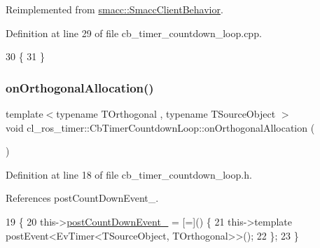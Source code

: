 Reimplemented from \hyperlink{classsmacc_1_1SmaccClientBehavior_a7e4fb6ce81ff96dc172425852d69c0c5}{smacc\+::\+Smacc\+Client\+Behavior}.



Definition at line 29 of file cb\+\_\+timer\+\_\+countdown\+\_\+loop.\+cpp.


\begin{DoxyCode}
30 \{
31 \}
\end{DoxyCode}
\mbox{\label{classcl__ros__timer_1_1CbTimerCountdownLoop_a17ca92a8d78d823b217b0418fa3b09d7}} 
\subsubsection{\texorpdfstring{on\+Orthogonal\+Allocation()}{onOrthogonalAllocation()}}
{\footnotesize\ttfamily template$<$typename T\+Orthogonal , typename T\+Source\+Object $>$ \\
void cl\+\_\+ros\+\_\+timer\+::\+Cb\+Timer\+Countdown\+Loop\+::on\+Orthogonal\+Allocation (\begin{DoxyParamCaption}{ }\end{DoxyParamCaption})\hspace{0.3cm}{\ttfamily [inline]}}



Definition at line 18 of file cb\+\_\+timer\+\_\+countdown\+\_\+loop.\+h.



References post\+Count\+Down\+Event\+\_\+.


\begin{DoxyCode}
19     \{
20         this->\hyperlink{classcl__ros__timer_1_1CbTimerCountdownLoop_aafc2594c2923e4a355394ffb339d1800}{postCountDownEvent\_} = [=]() \{
21             this->\textcolor{keyword}{template} postEvent<EvTimer<TSourceObject, TOrthogonal>>();
22         \};
23     \}
\end{DoxyCode}
\mbox{\label{classcl__ros__timer_1_1CbTimerCountdownLoop_ad251cc8444ca7070f64658bbb77e1275}} 
